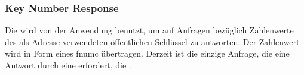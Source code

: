 \asprotokeyencblocksizereqbytefield


\subsubsection{Key Number Response}
\label{dcl-asproto-keynum}
Die \msg{\asprotokeynum} wird von der Anwendung benutzt, um auf Anfragen
bezüglich Zahlenwerte des als Adresse verwendeten öffentlichen Schlüssel zu
antworten.
Der Zahlenwert wird in Form eines \gls{fnumc} übertragen.
Derzeit ist die einzige Anfrage, die eine Antwort durch eine
\msg{\asprotokeynum} erfordert, die \msg{\asprotokeyencblocksizereq}.

\asprotokeynumbytefield
